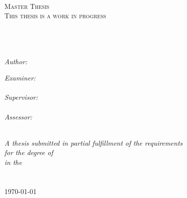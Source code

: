 \documentclass[11pt, oneside, dvipsnames]{Thesis} %
\begin{document}
\begingroup
\hypersetup{
	urlcolor=black
}
\begin{titlepage}
	\begin{center}

		\textsc{\LARGE \univname}\\[1.5cm] %
		\textsc{\Large Master Thesis}\\[0.5cm] %
		\textsc{\textcolor{RedOrange}{\Large This thesis is a work in progress}}\\

		\HRule \\[0.4cm] %
		{\huge \bfseries \ttitle}\\[0.4cm] %
		\HRule \\[1.5cm] %

		\begin{minipage}{0.4\textwidth}
			\begin{flushleft} \large
				\emph{Author:}\\
				\href{http://amirsahrani.com}{\authornames} %
			\end{flushleft}
		\end{minipage}
		\begin{minipage}{0.4\textwidth}
			\begin{flushright} \large
				\emph{Examiner:} \\
				{\exname}\\
				\emph{Supervisor:} \\
				{\supname}\\
				\emph{Assessor:} \\
				{\assessorname}
			\end{flushright}
		\end{minipage}\\[1cm]

		\large \textit{A thesis submitted in partial fulfillment of the requirements\\ for the degree of \degreename}\\[0.3cm] %
		\textit{in the}\\[0.4cm]
		\groupname\\\deptname\\[2cm] %

		{\large \today}\\[2cm] %

		\vfill
	\end{center}

\end{titlepage}
\endgroup
\end{document}
